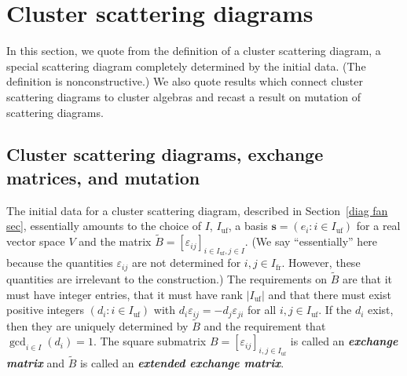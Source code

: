 \documentclass{amsart}
\newtheorem{lemma}[proposition]{Lemma}
\theoremstyle{definition}
\theoremstyle{remark}
\numberwithin{equation}{section}
\newcommand{\newword}[1]{\textbf{\emph{#1}}}
\newcommand{\ep}{\varepsilon}
\newcommand{\uf}{{\operatorname{uf}}}
\newcommand{\fr}{{\operatorname{fr}}}
\newcommand{\D}{{\mathfrak D}}
\newcommand{\0}{{\mathbf{0}}}
\newcommand{\s}{\mathbf{s}}
\newcommand{\tB}{\tilde{B}}
\newcommand{\R}{\mathcal{R}}
\begin{document}
%




\section{Cluster scattering diagrams}\label{clus scat sec}
In this section, we quote from \cite{GHKK} the definition of a cluster scattering diagram, a special scattering diagram completely determined by the initial data.
(The definition is nonconstructive.)
We also quote results which connect cluster scattering diagrams to cluster algebras and recast a result on mutation of scattering diagrams.

\subsection{Cluster scattering diagrams, exchange matrices, and mutation}\label{ex mat sec}
The initial data for a cluster scattering diagram, described in Section~\ref{diag fan sec}, essentially amounts to the choice of $I$, $I_\uf$, a basis $\s=(e_i:i\in I_\uf)$ for a real vector space $V$ and the matrix ${\tB=[\ep_{ij}]_{i\in I_\uf,j\in I}}$.
(We say ``essentially'' here because the quantities $\ep_{ij}$ are not determined for $i,j\in I_\fr$.
However, these quantities are irrelevant to the construction.) 
The requirements on $\tB$ are that it must have integer entries, that it must have rank $|I_\uf|$ and that there must exist positive integers $(d_i:i\in I_\uf)$ with $d_i\ep_{ij}=-d_j\ep_{ji}$ for all $i,j\in I_\uf$.
If the $d_i$ exist, then they are uniquely determined by $\tB$ and the requirement that $\gcd_{i\in I}(d_i)=1$.
The square submatrix ${B=[\ep_{ij}]_{i,j\in I_\uf}}$ is called an \newword{exchange matrix} and $\tB$ is called an \newword{extended exchange matrix}.
\end{document}
